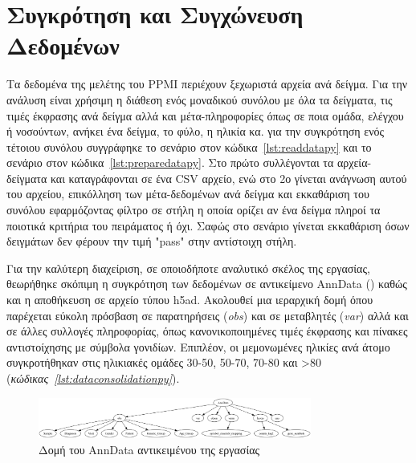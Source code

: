 \documentclass[12pt]{report}
\begin{document}
    \section{Συγκρότηση και Συγχώνευση Δεδομένων}
        \par
            Τα δεδομένα της μελέτης του PPMI περιέχουν ξεχωριστά αρχεία ανά δείγμα. Για την ανάλυση είναι χρήσιμη η διάθεση ενός μοναδικού συνόλου με όλα τα δείγματα, τις τιμές έκφρασης ανά δείγμα αλλά και μέτα-πληροφορίες όπως σε ποια ομάδα, ελέγχου ή νοσούντων, ανήκει ένα δείγμα, το φύλο, η ηλικία κα. για την συγκρότηση ενός τέτοιου συνόλου συγγράφηκε το σενάριο στον κώδικα~\ref{lst:readdatapy} και το σενάριο στον κώδικα~\ref{lst:preparedatapy}. Στο πρώτο συλλέγονται τα αρχεία-δείγματα και καταγράφονται σε ένα CSV αρχείο, ενώ στο 2ο γίνεται ανάγνωση αυτού του αρχείου, επικόλληση των μέτα-δεδομένων ανά δείγμα και εκκαθάριση του συνόλου εφαρμόζοντας φίλτρο σε στήλη η οποία ορίζει αν ένα δείγμα πληροί τα ποιοτικά κριτήρια του πειράματος ή όχι. Σαφώς στο σενάριο γίνεται εκκαθάριση όσων δειγμάτων δεν φέρουν την τιμή "pass" στην αντίστοιχη στήλη.
        \par
            Για την καλύτερη διαχείριση, σε οποιοδήποτε αναλυτικό σκέλος της εργασίας, θεωρήθηκε σκόπιμη η συγκρότηση των δεδομένων σε αντικείμενο AnnData (\emph{\cite{Virshup2024Anndata:Matrices}}) καθώς και η αποθήκευση σε αρχείο τύπου h5ad. Ακολουθεί μια ιεραρχική δομή όπου παρέχεται εύκολη πρόσβαση σε παρατηρήσεις (\emph{obs}) και σε μεταβλητές (\emph{var}) αλλά και σε άλλες συλλογές πληροφορίας, όπως κανονικοποιημένες τιμές έκφρασης και πίνακες αντιστοίχησης με σύμβολα γονιδίων. Επιπλέον, οι μεμονωμένες ηλικίες ανά άτομο συγκροτήθηκαν στις ηλικιακές ομάδες 30-50, 50-70, 70-80 και >80 (\emph{κώδικας~\ref{lst:dataconsolidationpy}}).
            \begin{figure}[h]
                \centering
                \includegraphics[width=0.8\textwidth]{anndata_structure.png}
                \caption{Δομή του AnnData αντικειμένου της εργασίας}
                \label{fig:figure-1}
            \end{figure}
\end{document}
